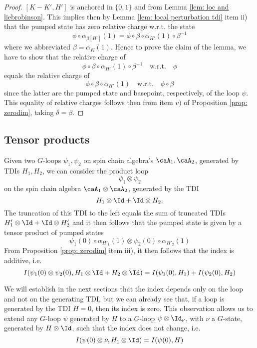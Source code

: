\begin{proof}
	$[K-K',H']$ is anchored in $\{0,1\}$ and from Lemma \ref{lem: loc and liebrobinson}. This implies then by Lemma \ref{lem: local perturbation tdi} item ii) that the pumped state has zero relative charge w.r.t. the state
	$$
	\phi \circ \alpha_{\beta[H']}(1)= \phi \circ \beta \circ \alpha_{H'}(1) \circ \beta^{-1}
	$$
	where we abbreviated $\beta=\alpha_{K}(1)$. 
	Hence to prove the claim of the lemma, we have to show that the relative charge of 
	$$
	\phi\circ \beta \circ \alpha_{H'}(1)\circ \beta^{-1}  \quad \text{w.r.t.}\quad \phi
	$$
	equals the relative charge of 
	$$
	\phi\circ \beta \circ \alpha_{H'}(1)  \quad \text{w.r.t.}\quad \phi\circ \beta
	$$
	since the latter are the pumped state and basepoint, respectively, of the loop $\psi$.
	This equality of relative charges follows then from item $v)$ of Proposition \ref{prop: zerodim}, taking $\delta=\beta$.
\end{proof}


\subsection{Tensor products}\label{sec: tensor products}

Given two $G$-loops $\psi_1,\psi_2$ on spin chain algebra's $\caA_1,\caA_2$, generated by TDIs $H_1,H_2$, we can consider the product loop 
$$
\psi_1 \otimes\psi_2
$$
on the spin chain algebra $\caA_1\otimes\caA_2$,
generated by the TDI
$$
H_1\otimes \Id +\Id \otimes H_2.
$$
The truncation of this TDI to the left equals the sum of truncated TDIs $H'_1\otimes \Id + \Id \otimes H'_2$ and it then follows that the pumped state is given by a tensor product of pumped states 
$$
\psi_1(0) \circ\alpha_{H'_1}(1) \otimes \psi_2(0) \circ\alpha_{H'_2}(1)
$$  
From Proposition \ref{prop: zerodim} item iii),  it then follows that the index is additive, i.e.
$$
I(\psi_1(0) \otimes \psi_2(0),H_1\otimes \Id +H_2\otimes \Id ) =
I(\psi_1(0),H_1 ) + I(\psi_2(0),H_2) 
$$

We will establish in the next sections that the index depends only on the loop and not on the generating TDI, but we can already see that, if a loop is generated by the TDI $H=0$, then its index is zero. This observation allows us to extend any $G$-loop $\psi$  generated by $H$ to a $G$-loop  $\psi\otimes \Id_\nu$, with $\nu$ a $G$-state, generated by $H\otimes\Id$, such that the index does not change, i.e.\
\begin{equation} \label{eq: index adjoining constant loop}
	I(\psi(0)\otimes\nu,H_1\otimes \Id)=I(\psi(0) ,H)
\end{equation}


